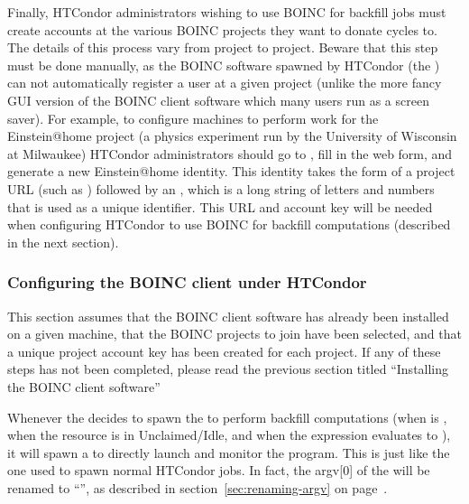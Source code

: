 Finally, HTCondor administrators wishing to use BOINC for backfill jobs
must create accounts at the various BOINC projects they want to donate
cycles to.
The details of this process vary from project to project.
Beware that this step must be done manually, as the BOINC software
spawned by HTCondor (the ) can not automatically
register a user at a given project (unlike the more fancy GUI version
of the BOINC client software which many users run as a screen saver). 
For example, to configure machines to perform work for the
Einstein@home project (a physics experiment run by the University of
Wisconsin at Milwaukee) HTCondor administrators should go to
, fill in
the web form, and generate a new Einstein@home identity.
This identity takes the form of a project URL (such as
) followed by an ,
which is a long string of letters and numbers that is used as a unique
identifier. 
This URL and account key will be needed when configuring HTCondor to use
BOINC for backfill computations (described in the next section).


\subsubsection{\label{sec:Backfill-BOINC-HTCondor}Configuring the BOINC client
under HTCondor}


This section assumes that the BOINC client software has already been
installed on a given machine, that the BOINC projects to join have
been selected, and that a unique project account key has been created
for each project.
If any of these steps has not been completed, please read the previous
section titled ``Installing the BOINC client software''

Whenever the  decides to spawn the 
to perform backfill computations (when  is
, when the resource is in Unclaimed/Idle, and when the
 expression evaluates to ), it will
spawn a  to directly launch and monitor the
 program.
This  is just like the one used to spawn normal HTCondor
jobs.
In fact, the argv[0] of the  will be renamed to
``'', as described in section~\ref{sec:renaming-argv} on 
page~\pageref{sec:renaming-argv}.

